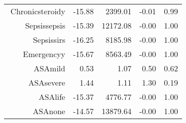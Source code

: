\begin{tabular}{rrrrr}
$$  Chronic\-steroid\-y & -15.88 & 2399.01 & -0.01 & 0.99 \\ 
  Sepsis\-sepsis & -15.39 & 12172.08 & -0.00 & 1.00 \\ 
  Sepsis\-sirs & -16.25 & 8185.98 & -0.00 & 1.00 \\ 
  Emergency\-y & -15.67 & 8563.49 & -0.00 & 1.00 \\ 
  ASA\-mild & 0.53 & 1.07 & 0.50 & 0.62 \\ 
  ASA\-severe & 1.44 & 1.11 & 1.30 & 0.19 \\ 
  ASA\-life & -15.37 & 4776.77 & -0.00 & 1.00 \\ 
  ASA\-none & -14.57 & 13879.64 & -0.00 & 1.00 \\ 
   \hline
\end{tabular}

